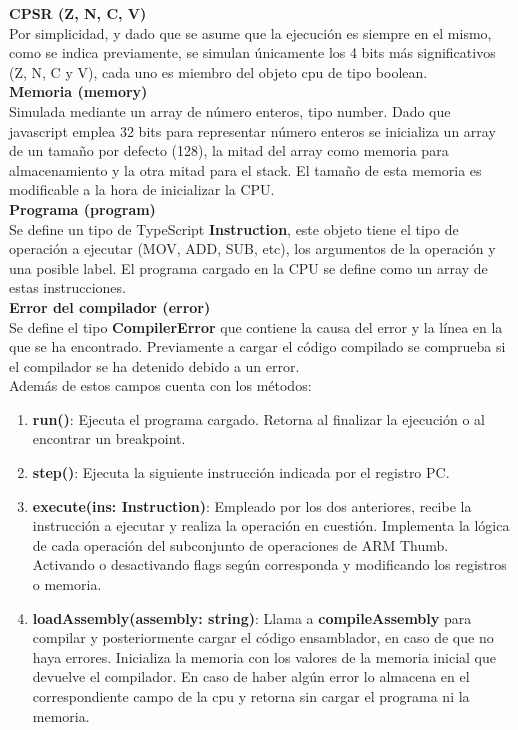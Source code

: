 {        \textbf{CPSR (Z, N, C, V)} \\
        Por simplicidad, y dado que se asume que la ejecución es siempre en el mismo, como se indica previamente,
        se simulan únicamente los 4 bits más significativos (Z, N, C y V), cada uno es miembro del objeto cpu
        de tipo boolean. \\

        \textbf{Memoria (memory)} \\
        Simulada mediante un array de número enteros, tipo number. Dado que javascript emplea 32 bits para representar número enteros
        se inicializa un array de un tamaño por defecto (128), la mitad del array como memoria para almacenamiento y la otra mitad para el stack.
        El tamaño de esta memoria es modificable a la hora de inicializar la CPU. \\
        
        \textbf{Programa (program)} \\
        Se define un tipo de TypeScript \textbf{Instruction}, este objeto tiene el tipo de operación a ejecutar
        (MOV, ADD, SUB, etc), los argumentos de la operación y una posible label. El programa cargado en la CPU se define como un array de estas instrucciones. \\

        \textbf{Error del compilador (error)} \\
        Se define el tipo \textbf{CompilerError} que contiene la causa del error y la línea en la que se ha encontrado.
        Previamente a cargar el código compilado se comprueba si el compilador se ha detenido debido a un error. \\

        Además de estos campos cuenta con los métodos:
        \begin{enumerate}
            \item \textbf{run()}: Ejecuta el programa cargado. Retorna al finalizar la ejecución o al encontrar un breakpoint.
            \item \textbf{step()}: Ejecuta la siguiente instrucción indicada por el registro PC.
            \item \textbf{execute(ins: Instruction)}: Empleado por los dos anteriores, recibe la instrucción a ejecutar y realiza la operación en cuestión.
                Implementa la lógica de cada operación del subconjunto de operaciones de ARM Thumb.
                Activando o desactivando flags según corresponda y modificando los registros o memoria.
            \item \textbf{loadAssembly(assembly: string)}: Llama a \textbf{compileAssembly} para compilar y posteriormente cargar el código ensamblador, en caso de que no haya errores.
                Inicializa la memoria con los valores de la memoria inicial que devuelve el compilador. En caso de haber algún error lo almacena en el correspondiente campo de la cpu
                y retorna sin cargar el programa ni la memoria.
        \end{enumerate}

}
